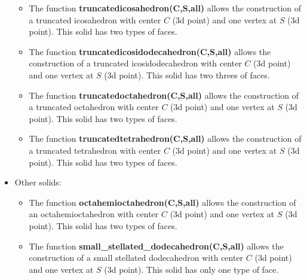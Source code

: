 \begin{itemize}
\begin{itemize}
    \item The function \textbf{truncatedicosahedron(C,S,all)} allows the construction of a truncated icosahedron with center $C$ (3d point) and one vertex at $S$ (3d point). This solid has two types of faces.
    \item The function \textbf{truncatedicosidodecahedron(C,S,all)} allows the construction of a truncated icosidodecahedron with center $C$ (3d point) and one vertex at $S$ (3d point). This solid has two threes of faces.
    \item The function \textbf{truncatedoctahedron(C,S,all)} allows the construction of a truncated octahedron with center $C$ (3d point) and one vertex at $S$ (3d point). This solid has two types of faces.
    \item The function \textbf{truncatedtetrahedron(C,S,all)} allows the construction of a truncated tetrahedron with center $C$ (3d point) and one vertex at $S$ (3d point). This solid has two types of faces.
\end{itemize}

    \item Other solids:
\begin{itemize}
    \item The function \textbf{octahemioctahedron(C,S,all)} allows the construction of an octahemioctahedron with center $C$ (3d point) and one vertex at $S$ (3d point). This solid has two types of faces.
    \item The function \textbf{small\_stellated\_dodecahedron(C,S,all)} allows the construction of a small stellated dodecahedron with center $C$ (3d point) and one vertex at $S$ (3d point). This solid has only one type of face.

\end{itemize}
\end{itemize}


